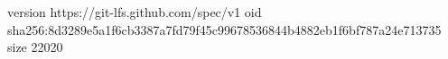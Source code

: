 version https://git-lfs.github.com/spec/v1
oid sha256:8d3289e5a1f6cb3387a7fd79f45c99678536844b4882eb1f6bf787a24e713735
size 22020
